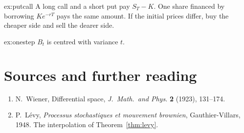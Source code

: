 \begin{solution}{ex:putcall}
\writeup A long call and a short put pay $S_T-K$. One share financed by borrowing $Ke^{-rT}$ pays the same amount. If the initial prices differ, buy the cheaper side and sell the dearer side.
\end{solution}

\begin{solution}{ex:onestep}
\writeup $B_t$ is centred with variance $t$.
\end{solution}

\section*{Sources and further reading}

\begin{enumerate}
\item N.~Wiener, Differential space, \emph{J.\ Math.\ and Phys.} \textbf{2} (1923), 131--174.
\item P.~L\'evy, \emph{Processus stochastiques et mouvement brownien}, Gauthier-Villars, 1948. The interpolation of Theorem~\ref{thm:levy}.
\end{enumerate}
